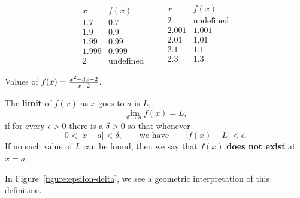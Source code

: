 \begin{margintable}[-1in]
\[
\begin{array}{c|c}
 x & f(x) \\ \hline
 1.7 &  0.7 \\
 1.9 &  0.9 \\
 1.99 &  0.99 \\
 1.999 &  0.999 \\
  2 &  \text{undefined}
\end{array}\qquad
\begin{array}{c|c}
 x & f(x) \\ \hline
  2 & \text{undefined}\\
 2.001&  1.001\\
 2.01&  1.01\\
 2.1 &  1.1 \\
 2.3 &  1.3 \\
\end{array}
\]
\caption{Values of $f(x)=\protect\frac{x^2 - 3x + 2}{x-2}$.}
\label{table:(x^2 - 3x + 2)/(x-2)}
\end{margintable}


\begin{definition}\label{def:limit}
The \textbf{limit} of $f(x)$ as $x$ goes to $a$ is $L$,
\[
\lim_{x\to a}f(x)=L,
\] 
if for every $\epsilon>0$ there is a $\delta > 0$ so that whenever
\[
0 < |x-a| < \delta, \qquad\text{we have} \qquad |f(x)-L|<\epsilon.
\] 
If no such value of $L$ can be
found, then we say that $f(x)$ \textbf{does not exist} at $x=a$.
\end{definition}

In Figure~\ref{figure:epsilon-delta}, we see a geometric
interpretation of this definition.

